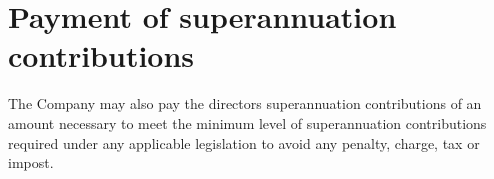 \section{Payment of superannuation contributions}

The Company may also pay the directors superannuation contributions of an amount necessary to meet the minimum level of superannuation contributions required under any applicable legislation to avoid any penalty, charge, tax or impost. 